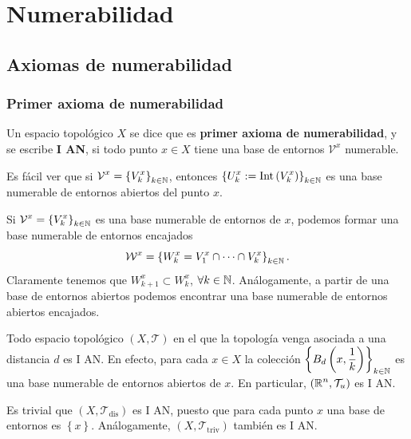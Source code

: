 \chapter{Numerabilidad}
\section{Axiomas de numerabilidad}
\subsection{Primer axioma de numerabilidad}
\begin{definition}
Un espacio topológico $\displaystyle X $ se dice que es \textbf{primer axioma de numerabilidad}, y se escribe \textbf{I AN}, si todo punto $\displaystyle x \in X $ tiene una base de entornos $\displaystyle \mathcal{V}^{x} $ numerable.
\end{definition}
\begin{observation}
	Es fácil ver que si $\displaystyle \mathcal{V}^{x} = \left\{ V_{k}^{x}\right\} _{k \in \mathbb{N}} $, entonces $\displaystyle \left\{ U_{k}^{x}:=\operatorname{Int}\left(V_{k}^{x}\right)\right\} _{k\in \mathbb{N}} $ es una base numerable de entornos abiertos del punto $\displaystyle x $. 
\end{observation}
\begin{observation}
	Si $\displaystyle \mathcal{V}^{x}= \left\{ V_{k}^{x}\right\} _{k \in \mathbb{N}} $ es una base numerable de entornos de $\displaystyle x $, podemos formar una base numerable de entornos encajados
	\[\mathcal{W}^{x}= \left\{ W^{x}_{k}= V_{1}^{x}\cap \cdots \cap V^{x}_{k}\right\} _{k \in \mathbb{N}} .\]
	Claramente tenemos que $\displaystyle W^{x}_{k+1}\subset W^{x}_{k} $, $\displaystyle \forall k \in \mathbb{N} $. Análogamente, a partir de una base de entornos abiertos podemos encontrar una base numerable de entornos abiertos encajados. 
\end{observation}
\begin{eg}
	Todo espacio topológico $\displaystyle \left(X, \mathcal{T}\right) $ en el que la topología venga asociada a una distancia $\displaystyle d $ es I AN. En efecto, para cada $\displaystyle x \in X$ la colección $\displaystyle \left\{ B_{d}\left(x, \frac{1}{k}\right)\right\} _{k\in \mathbb{N}} $ es una base numerable de entornos abiertos de $\displaystyle x $. En particular, $\displaystyle \left(\mathbb{R}^{n}, \mathcal{T}_{u}\right) $ es I AN.
\end{eg}
\begin{eg}
	Es trivial que $\displaystyle \left(X, \mathcal{T}_{\text{dis}}\right) $ es I AN, puesto que para cada punto $\displaystyle x $ una base de entornos es $\displaystyle \left\{ x\right\}  $. Análogamente, $\displaystyle \left(X, \mathcal{T}_{\text{triv}}\right) $ también es I AN.
\end{eg}
